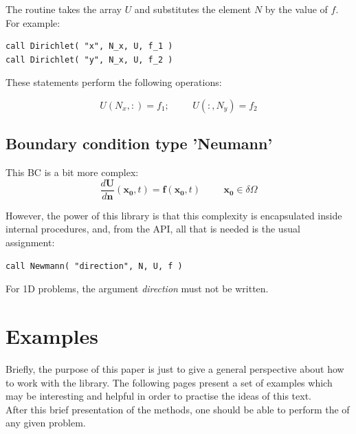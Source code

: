 The routine takes the array $U$ and substitutes the element $N$ by the value of
$f$. For example:

\begin{blueframed}
\begin{lstlisting}
call Dirichlet( "x", N_x, U, f_1 ) 
call Dirichlet( "y", N_x, U, f_2 ) 
\end{lstlisting}
\end{blueframed}

These statements perform the following operations: 

$$
U(N_x,:)=f_1; \hspace{1cm}
U(:,N_y)=f_2
$$

\subsection{Boundary condition type 'Neumann'}

This BC is a bit more complex: 
$$
\frac{d \mathbf U}{d \mathbf n}(\mathbf{x_0},t)= \mathbf f(\mathbf{x_0},t)
  		\hspace{1cm}  \mathbf{x_0}
  		\in \delta \Omega 
  		$$

However, the power of this library is that this complexity is encapsulated
inside internal procedures, and, from the API, all that is needed is the usual assignment: 

\begin{blueframed}
\begin{lstlisting}
call Newmann( "direction", N, U, f ) 
\end{lstlisting}
\end{blueframed}

For 1D problems, the argument \textit{direction} must not be written.\\

\newpage

\section{Examples}

Briefly, the purpose of this paper is just to give a general perspective about
how to work with the  library. The following
pages present a set of examples which may be interesting and helpful in order to
practise the ideas of this text. \\

After this brief presentation of the methods, one should be able to perform the
 of any given problem.\\



